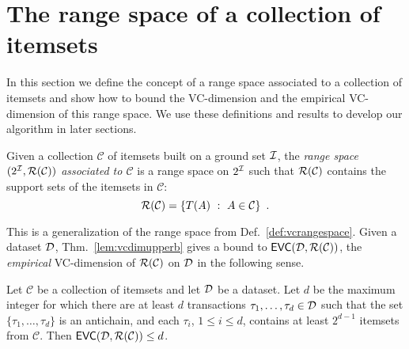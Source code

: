 \section{The range space of a collection of itemsets}\label{sec:range}
In this section we define the concept of a range space associated to a
collection of itemsets and show how to bound the VC-dimension and the
empirical VC-dimension of this range space. We use these definitions and results
to develop our algorithm in later sections.

\begin{definition}\label{def:rangeset}
Given a collection $\mathcal{C}$ of itemsets built on a ground set ${\cal I}$, the
\emph{range space $(2^{\cal I},\mathcal{R}(\mathcal{C}))$ associated to $\mathcal{C}$} is a range
space on $2^{\cal I}$ such that $\mathcal{R}(\mathcal{C})$ contains the support sets of
the itemsets in $\mathcal{C}$:
\[\mathcal{R}(\mathcal{C})=\{T(A) ~:~ A\in\mathcal{C}\}\enspace.\]
\end{definition}
This is a generalization of the range space from Def.~\ref{def:vcrangespace}.
Given a dataset ${\cal D}$, Thm.~\ref{lem:vcdimupperb} gives a bound to
$\mathsf{EVC}({\cal D},\mathcal{R}(\mathcal{C}))$, the \emph{empirical} VC-dimension of
$\mathcal{R}(\mathcal{C})$ on ${\cal D}$ in the following sense.


\begin{theorem}\label{lem:evcdimupbound}
  Let $\mathcal{C}$ be a collection of itemsets and let ${\cal D}$ be a dataset. Let
  $d$ be the maximum integer for which there are at least $d$
  transactions $\tau_1,\dotsc,\tau_d\in {\cal D}$ such that the set
  $\{\tau_1,\dotsc,\tau_d\}$ is an antichain, and each $\tau_i$, $1\le i\le d$,
  contains at least $2^{d-1}$ itemsets from $\mathcal{C}$. 
  Then $\mathsf{EVC}({\cal D},\mathcal{R}(\mathcal{C}))\le d$.
\end{theorem}

